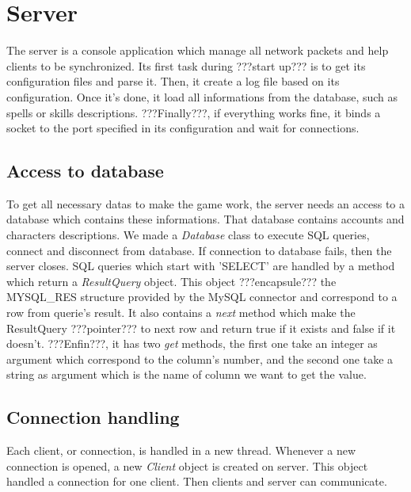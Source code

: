 \documentclass{scrreprt}
\begin{document}

				\section{Server}
				The server is a console application which manage all network packets and help clients to be synchronized. Its first task during ???start up??? is to  get its configuration files and parse it. Then, it create a log file based on its configuration. Once it's done, it load all informations from the database, such as spells or skills descriptions. ???Finally???, if everything works fine, it binds a socket to the port specified in its configuration and wait for connections.
				\subsection{Access to database}
				To get all necessary datas to make the game work, the server needs an access to a database which contains these informations. That database contains accounts and characters descriptions. We made a \emph{Database} class to execute SQL queries, connect and disconnect from database. If connection to database fails, then the server closes. SQL queries which start with 'SELECT' are handled by a method which return a \emph{ResultQuery} object. This object ???encapsule??? the MYSQL\_RES structure provided by the MySQL connector and correspond to a row from querie's result. It also contains a \emph{next} method which make the ResultQuery ???pointer??? to next row and return true if it exists and false if it doesn't. ???Enfin???, it has two \emph{get} methods, the first one take an integer as argument which correspond to the column's number, and the second one take a string as argument which is the name of column we want to get the value.
				\subsection{Connection handling}
				Each client, or connection, is handled in a new thread. Whenever a new connection is opened, a new \emph{Client} object is created on server. This object handled a connection for one client. Then clients and server can communicate.
\end{document}
